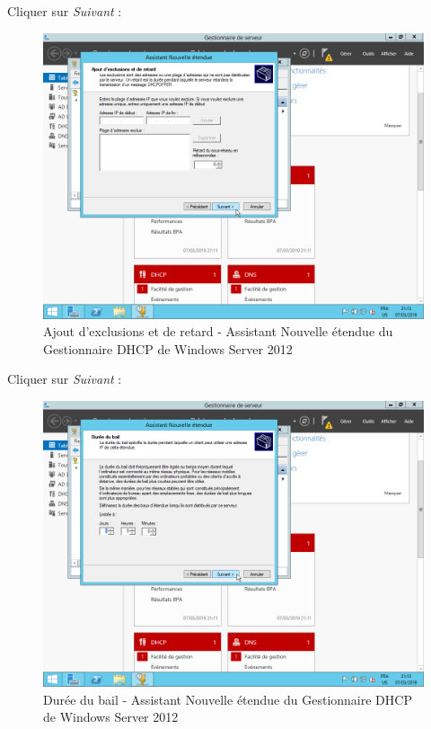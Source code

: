 \newpage
Cliquer sur \textit{Suivant} :
\begin{figure}[h!]
    \begin{center}
        \includegraphics[scale=0.6]{WS2012_Screenshots/45.png}
        \caption{Ajout d'exclusions et de retard - Assistant Nouvelle étendue du Gestionnaire DHCP de Windows Server 2012}
        \label{WS2012_Screenshots/45}
    \end{center}
\end{figure}
\FloatBarrier

\newpage
Cliquer sur \textit{Suivant} :
\begin{figure}[h!]
    \begin{center}
        \includegraphics[scale=0.6]{WS2012_Screenshots/46.png}
        \caption{Durée du bail - Assistant Nouvelle étendue du Gestionnaire DHCP de Windows Server 2012}
        \label{WS2012_Screenshots/46}
    \end{center}
\end{figure}
\FloatBarrier

